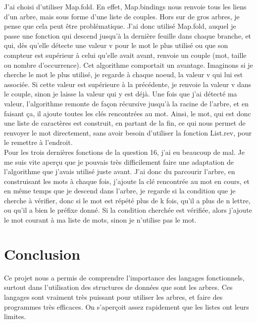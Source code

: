 \documentclass[a4paper, title page, 12pt]{report}
\begin{document}
	J'ai choisi d'utiliser Map.fold. En effet, Map.bindings nous renvoie tous les liens d'un arbre, mais sous forme d'une liste de couples. Hors sur de gros arbres, je pense que cela peut être problématique. J'ai donc utilisé Map.fold, auquel je passe une fonction qui descend jusqu'à la dernière feuille dans chaque branche, et qui, dès qu'elle détecte une valeur v pour le mot le plus utilisé ou que son compteur est supérieur à celui qu'elle avait avant, renvoie un couple (mot, taille ou nombre d'occurrence). Cet algorithme comportait un avantage. Imaginons si je cherche le mot le plus utilisé, je regarde à chaque noeud, la valeur v qui lui est associée. Si cette valeur est supérieure à la précédente, je renvoie la valeur v dans le couple, sinon je laisse la valeur qui y est déjà. Une fois que j'ai détecté ma valeur, l'algorithme remonte de façon récursive jusqu'à la racine de l'arbre, et en faisant ça, il ajoute toutes les clés rencontrées au mot. Ainsi, le mot, qui est donc une liste de caractères est construit, en partant de la fin, ce qui nous permet de renvoyer le mot directement, sans avoir besoin d'utiliser la fonction List.rev, pour le remettre à l'endroit.\\
	
	Pour les trois dernières fonctions de la question 16, j'ai eu beaucoup de mal. Je me suis vite aperçu que je pouvais très difficilement faire une adaptation de l'algorithme que j'avais utilisé juste avant. J'ai donc du parcourir l'arbre, en construisant les mots à chaque fois, j'ajoute la clé rencontrée au mot en cours, et en même temps que je descend dans l'arbre, je regarde si la condition que je cherche à vérifier, donc si le mot est répété plus de k fois, qu'il a plus de n lettre, ou qu'il a bien le préfixe donné. Si la condition cherchée est vérifiée, alors j'ajoute le mot courant à ma liste de mots, sinon je n'utilise pas le mot.
	\section*{Conclusion}
	Ce projet nous a permis de comprendre l'importance des langages fonctionnels, surtout dans l'utilisation des structures de données que sont les arbres. Ces langages sont vraiment très puissant pour utiliser les arbres, et faire des programmes très efficaces. On s'aperçoit assez rapidement que les listes ont leurs limites.
\end{document}
